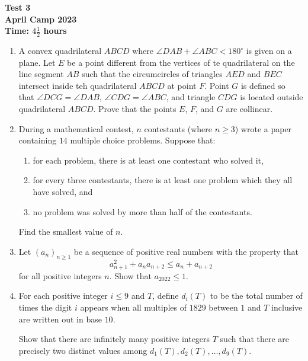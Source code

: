 \documentclass{article}
\begin{document}
\thispagestyle{empty}

\begin{center}
  \textbf{\Large Test 3}
  \\ \vspace{1em}
  \textbf{\large April Camp 2023}
  \\ \vspace{1em}
  \textbf{\large Time: $4\frac{1}{2}$ hours}
\end{center}

\bigskip

\begin{enumerate}[itemsep=\fill]

\item %
A convex quadrilateral $ABCD$ where $\angle DAB +\angle ABC < 180^\circ$ is given on a plane.
Let $E$ be a point different from the vertices of te quadrilateral on the line segment $AB$ such that the circumcircles of triangles $AED$ and $BEC$ intersect inside teh quadrilateral $ABCD$ at point $F$.
Point $G$ is defined so that $\angle DCG = \angle DAB$, $\angle CDG = \angle ABC$, and triangle $CDG$ is located outside quadrilateral $ABCD$.
Prove that the points $E$, $F$, and $G$ are collinear.


\item %
During a mathematical contest, $n$ contestants (where $n \geq 3$) wrote a paper containing $14$ multiple choice problems.
Suppose that:
\begin{enumerate}[label=(\roman*)]
  \item for each problem, there is at least one contestant who solved it,
  \item for every three contestants, there is at least one problem which they all have solved, and
  \item no problem was solved by more than half of the contestants.
\end{enumerate}
Find the smallest value of $n$.


\item %
Let $(a_n)_{n \geq 1}$ be a sequence of positive real numbers with the property that
\[ a_{n+1}^2 +a_n a_{n+2} \leq a_n +a_{n+2} \]
for all positive integers $n$.
Show that $a_{2022} \leq 1$.


\item %
For each positive integer $i \leq 9$ and $T$, define $d_i(T)$ to be the total number of times the digit $i$ appears when all multiples of $1829$ between $1$ and $T$ inclusive are written out in base $10$.

Show that there are infinitely many positive integers $T$ such that there are precisely two distinct values among $d_1(T), d_2(T), \dotsc, d_9(T)$.

\end{enumerate}
\end{document}
